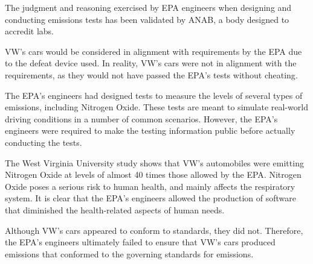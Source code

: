 

The judgment and reasoning exercised by EPA engineers when designing and conducting emissions tests has been validated\cite{anab_accreditation} by ANAB\cite{anab_recognition}, a body designed to accredit labs.

VW's cars would be considered in alignment with requirements by the EPA due to the defeat device used\cite{study_details}. In reality, VW's cars were not in alignment with the requirements, as they would not have passed the EPA's tests without cheating\cite{study}.

The EPA's engineers had designed tests to measure the levels of several types of emissions, including Nitrogen Oxide\cite{epa_track_details}. These tests are meant to simulate real-world driving conditions in a number of common scenarios. However, the EPA's engineers were required to make the testing information public before actually conducting the tests\cite{study_details}. 

The West Virginia University study shows that VW's automobiles were emitting Nitrogen Oxide at levels of almost 40 times those allowed by the EPA\cite{study_details}. Nitrogen Oxide poses a serious risk to human health, and mainly affects the respiratory system\cite{health_effects_of_no}. It is clear that the EPA's engineers allowed the production of software that diminished the health-related aspects of human needs.

Although VW's cars appeared to conform to standards\cite{study_details}, they did not\cite{study}. Therefore, the EPA's engineers ultimately failed to ensure that VW's cars produced emissions that conformed to the governing standards for emissions.

